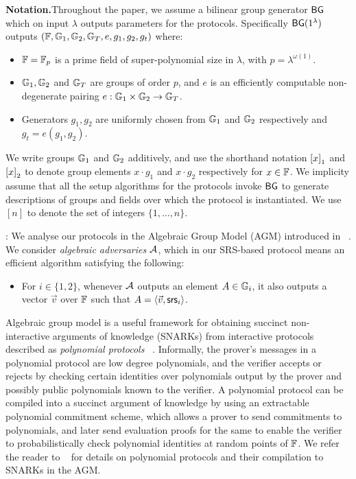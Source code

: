 
\noindent\textbf{Notation.}Throughout the paper, we assume a bilinear group generator $\mathsf{BG}$ which on input $\lambda$ outputs
parameters for the protocols. Specifically $\mathsf{BG}(1^{\lambda})$ outputs $(\mathbb{F},\mathbb{G}_1,\mathbb{G}_2,\mathbb{G}_T, e, g_1, g_2,g_t)$
where:
\begin{itemize}[leftmargin=2em, label=-]
	\item $\mathbb{F}={\mathbb{F}_p}$ is a prime field of super-polynomial size in $\lambda$, with $p=\lambda^{\omega(1)}$.
	\item $\mathbb{G}_1,\mathbb{G}_2$ and $\mathbb{G}_T$ are groups of order $p$, and $e$ is an efficiently computable non-degenerate
	pairing $e:\mathbb{G}_1\times \mathbb{G}_2\rightarrow \mathbb{G}_T$.
	\item Generators $g_1,g_2$ are uniformly chosen from $\mathbb{G}_1$ and $\mathbb{G}_2$ respectively and $g_t=e(g_1,g_2)$.
\end{itemize}
We write groups $\mathbb{G}_1$ and $\mathbb{G}_2$ additively, and use the shorthand notation $\left[{x}\right]_1$ and $\left[{x}\right]_2$
to denote group elements $x\cdot g_1$ and $x\cdot g_2$ respectively for $x\in \mathbb{F}$. We implicity assume
that all the setup algorithms for the protocols invoke $\mathsf{BG}$ to generate descriptions of groups and fields
over which the protocol is instantiated. We use $[n]$ to denote the set of integers $\{1,\ldots,n\}$.


: We analyse our protocols in the Algebraic Group Model (AGM) introduced
in ~\cite{C:FucKilLos18}. We consider {\em algebraic adversaries} $\mathcal{A}$, which in our SRS-based protocol means
an efficient algorithm satisfying the following:
\begin{itemize}[leftmargin=1em]
	\item For $i\in \{1,2\}$, whenever $\mathcal{A}$ outputs an element $A\in \mathbb{G}_i$, it also outputs a vector $\vec{v}$
	over $\mathbb{F}$ such that $A=\langle \vec{v},\mathsf{srs}_i\rangle$.
\end{itemize}
Algebraic group model is a useful framework for obtaining succinct non-interactive arguments of knowledge (SNARKs) from interactive protocols described as {\em polynomial protocols} ~\cite{Gabizon2019PLONKPO}. Informally, the prover's messages in a polynomial protocol are low degree polynomials, and the verifier accepts or rejects by checking certain identities
over polynomials output by the prover and possibly public polynomials known to the verifier. A polynomial protocol can
be compiled into a succinct argument of knowledge by using an extractable polynomial commitment scheme, which allows a
prover to send commitments to polynomials, and later send evaluation proofs for the same to enable the verifier to probabilistically
check polynomial identities at random points of $\mathbb{F}$. We refer the reader to ~\cite[Section 4.2]{Gabizon2019PLONKPO} for details on polynomial protocols and their compilation to SNARKs in the AGM.

